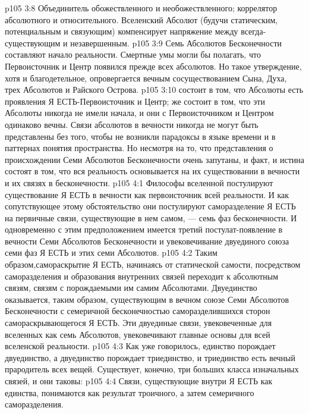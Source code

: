 \vs p105 3:8 \pc {}\bibnobreakspace {} Объединитель обожествленного и необожествленного; коррелятор абсолютного и относительного. Вселенский Абсолют (будучи статическим, потенциальным и связующим) компенсирует напряжение между всегда\hyp{}существующим и незавершенным.
\vs p105 3:9 \pc Семь Абсолютов Бесконечности составляют начало реальности. Смертные умы могли бы полагать, что Первоисточник и Центр появился прежде всех абсолютов. Но такое утверждение, хотя и благодетельное, опровергается вечным сосуществованием Сына, Духа, трех Абсолютов и Райского Острова.
\vs p105 3:10  состоит в том, что Абсолюты есть проявления Я ЕСТЬ\hyp{}Первоисточник и Центр;  же состоит в том, что эти Абсолюты никогда не имели начала, и они с Первоисточником и Центром одинаково вечны. Связи абсолютов в вечности никогда не могут быть представлены без того, чтобы не возникли парадоксы в языке времени и в паттернах понятия пространства. Но несмотря на то, что представления о происхождении Семи Абсолютов Бесконечности очень запутаны, и факт, и истина состоят в том, что вся реальность основывается на их существовании в вечности и их связях в бесконечности.
\vs p105 4:1 Философы вселенной постулируют существование Я ЕСТЬ в вечности как первоисточник всей реальности. И как сопутствующее этому обстоятельство они постулируют саморазделение Я ЕСТЬ на первичные связи, существующие в нем самом, --- семь фаз бесконечности. И одновременно с этим предположением имеется третий постулат\hyp{}появление в вечности Семи Абсолютов Бесконечности и увековечивание двуединого союза семи фаз Я ЕСТЬ и этих семи Абсолютов.
\vs p105 4:2 Таким образом,самораскрытие Я ЕСТЬ, начинаясь от статической самости, посредством саморазделения и образования внутренних связей переходит к абсолютным связям, связям с порождаемыми им самим Абсолютами. Двуединство оказывается, таким образом, существующим в вечном союзе Семи Абсолютов Бесконечности с семеричной бесконечностью саморазделившихся сторон самораскрывающегося Я ЕСТЬ. Эти двуединые связи, увековеченные для вселенных как семь Абсолютов, увековечивают главные основы для всей вселенской реальности.
\vs p105 4:3 Как уже говорилось, единство порождает двуединство, а двуединство порождает триединство, и триединство есть вечный прародитель всех вещей. Существует, конечно, три больших класса изначальных связей, и они таковы:
\vs p105 4:4 \bibnobreakspace {} Связи, существующие внутри Я ЕСТЬ как единства, понимаются как результат троичного, а затем семеричного саморазделения.
